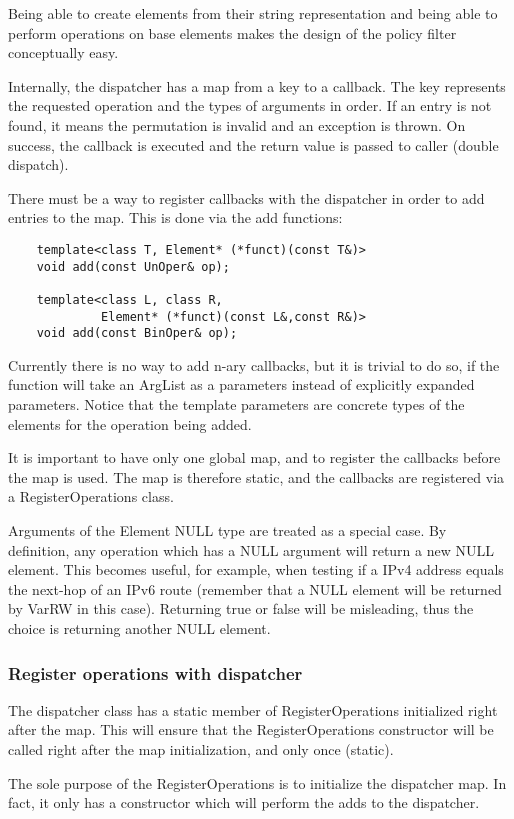 \documentclass{article}
\begin{document}
Being able to create elements from their string representation and being able to
perform operations on base elements makes the design of the policy filter
conceptually easy.

Internally, the dispatcher has a map from a key to a callback. The key
represents the requested operation and the types of arguments in order. If an
entry is not found, it means the permutation is invalid and an exception is
thrown. On success, the callback is executed and the return value is passed to
caller (double dispatch).

There must be a way to register callbacks with the dispatcher in order to add
entries to the map. This is done via the add functions:
\begin{verbatim}
    template<class T, Element* (*funct)(const T&)>
    void add(const UnOper& op);

    template<class L, class R, 
             Element* (*funct)(const L&,const R&)>
    void add(const BinOper& op);
\end{verbatim}
Currently there is no way to add n-ary callbacks, but it is trivial to do so, if
the function will take an ArgList as a parameters instead of explicitly expanded
parameters. Notice that the template parameters are concrete types of the
elements for the operation being added.

It is important to have only one global map, and to register the callbacks
before the map is used. The map is therefore static, and the callbacks are
registered via a RegisterOperations class.

Arguments of the Element NULL type are treated as a special case. By definition,
any operation which has a NULL argument will return a new NULL element. This
becomes useful, for example, when testing if a IPv4 address equals the next-hop
of an IPv6 route (remember that a NULL element will be returned by VarRW in this
case). Returning true or false will be misleading, thus the choice is returning
another NULL element.


\subsubsection{Register operations with dispatcher}
The dispatcher class has a static member of RegisterOperations initialized right
after the map. This will ensure that the RegisterOperations constructor will be
called right after the map initialization, and only once (static).

The sole purpose of the RegisterOperations is to initialize the dispatcher map.
In fact, it only has a constructor which will perform the adds to the
dispatcher. 
\end{document}
